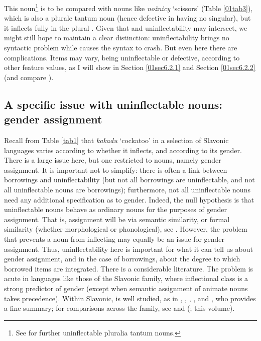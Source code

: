 \documentclass[output=paper,colorlinks,citecolor=brown]{langscibook}
\begin{document}
This noun\footnote{See \citet{dunn1989} for further uninflectable pluralia tantum nouns.} is to be compared with nouns like \textit{nožnicy} `scissors' (Table \ref{01tab3}), which is also a plurale tantum noun (hence defective in having no singular), but it inflects fully in the plural \citep[59--60]{corbett2019}. Given that  and uninflectability may intersect, we might still hope to maintain a clear distinction: uninflectability brings no syntactic problem while  causes the syntax to crash. But even here there are complications. Items may vary, being uninflectable or defective, according to other feature values, as I will show in Section \ref{01sec6.2.1} and Section \ref{01sec6.2.2} (and compare \citealt{nikolaevbermel2022}).

\subsection{A specific issue with uninflectable nouns: gender assignment}

Recall from Table \ref{tab1} that \textit{kakadu} `cockatoo' in a selection of Slavonic languages varies according to whether it inflects, and according to its gender. There is a large issue here, but one restricted to nouns, namely gender assignment. It is important not to simplify: there is often a link between borrowings and uninflectability (but not all borrowings are uninflectable, and not all uninflectable nouns are borrowings); furthermore, not all uninflectable nouns need any additional specification as to gender. Indeed, the null hypothesis is that uninflectable nouns behave as ordinary nouns for the purposes of gender assignment. That is, assignment will be via semantic similarity, or formal similarity (whether morphological or phonological), see \citet{feddenguzmannaranjocorbett2025}. However, the problem that prevents a noun from inflecting may equally be an issue for gender assignment. Thus, uninflectability here is important for what it can tell us about gender assignment, and in the case of borrowings, about the degree to which borrowed items are integrated. There is a considerable literature. The problem is acute in languages like those of the Slavonic family, where inflectional class is a strong predictor of gender (except when semantic assignment of animate nouns takes precedence). Within Slavonic,  is well studied, as in \citet{murphy2000}, \citet{wang2014}, \citet{matushansky2022}, \citet{chuprinkomagomedovaslioussar2023}, \citet{magomedova2024} and \citet[148--158]{timberlake2004}, who provides a fine summary; for comparisons across the family, see \citet[193--197]{thomas1983} and \citeauthor{doleschal2000} (\citeyear[48--151]{doleschal2000}; this volume).
\end{document}
